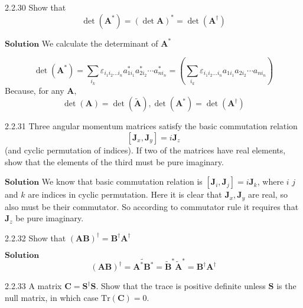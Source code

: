 \documentclass{styles/kaobook}
\begin{document}
\begin{greenbox}{2.2.30}
Show that
$$
\operatorname{det}\left(\mathbf{A}^{*}\right)=(\operatorname{det} \mathbf{A})^{*}=\operatorname{det}\left(\mathbf{A}^{\dagger}\right)
$$
\end{greenbox}


$\boxed{\textbf{Solution}}$  We calculate the determinant of $\mathbf{A}^{*}$

$$\operatorname{det}\left(\mathbf{A}^{*}\right)=\sum_{i_{k}} \varepsilon_{i_{1} i_{2} \ldots i_{n}} a_{1 i_{1}}^{*} a_{2 i_{2}}^{*} \cdots a_{n i_{n}}^{*}=\left(\sum_{i_{k}} \varepsilon_{i_{1} i_{2} \ldots i_{n}} a_{1 i_{1}} a_{2 i_{2}} \cdots a_{n i_{n}}\right)$$
Because, for any $\mathbf{A},$ 
$$\operatorname{det}(\mathbf{A})=\operatorname{det}(\tilde{\mathbf{A}}), \operatorname{det}\left(\mathbf{A}^{*}\right)=\operatorname{det}\left(\mathbf{A}^{\dagger}\right)$$



\begin{greenbox}{2.2.31}
Three angular momentum matrices satisfy the basic commutation relation
$$[\mathbf{J}_x, \mathbf{J}_y] = i\mathbf{J}_z$$
(and cyclic permutation of indices). If two of the matrices have real elements, show that
the elements of the third must be pure imaginary.
\end{greenbox}

$\boxed{\textbf{Solution}}$ We know that basic commutation relation is $\left[\mathbf{J}_{i}, \mathbf{J}_{j}\right]=i \mathbf{J}_{k}$, where $i$ $j$ and $k$ are indices in cyclic permutation.
Here it is clear that $\mathbf{J}_{x}, \mathbf{J}_{y}$ are real, so also must be their commutator. So according to
commutator rule it requires that $\mathbf{J}_{z}$ be pure imaginary.



\begin{greenbox}{2.2.32}
Show that $(\mathbf{A}\mathbf{B})^{\dagger}=\mathbf{B}^{\dagger} \mathbf{A}^{\dagger}$
\end{greenbox}



$\boxed{\textbf{Solution}}$ 
$$(\mathbf{A}\mathbf{B})^{\dagger}=\widetilde{\mathbf{A}^{*} \mathbf{B}^{*}}=\tilde{\mathbf{B}}^{*} \tilde{\mathbf{A}}^{*}=\mathbf{B}^{\dagger} \mathbf{A}^{\dagger}$$



\begin{greenbox}{2.2.33}
A matrix $\mathbf{C}=\mathbf{S}^{\dagger} \mathbf{S}$. Show that the trace is positive definite unless $\mathbf{S}$ is the null matrix, in which case $\text{Tr}(\mathbf{C})=0 .$
\end{greenbox}
\end{document}
